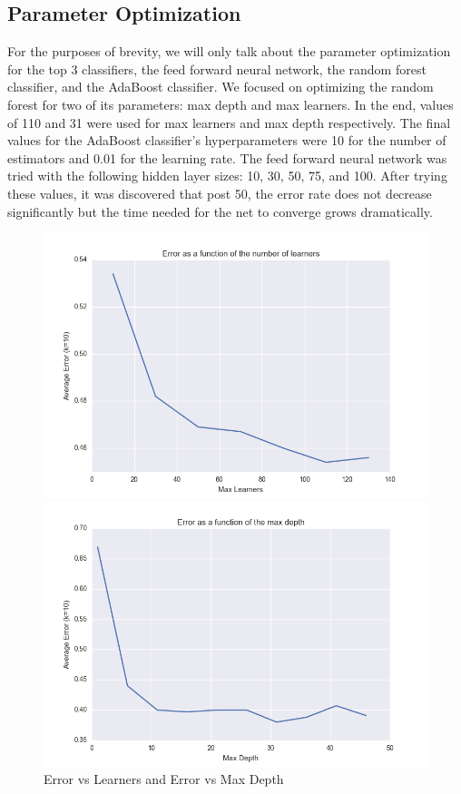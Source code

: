 \documentclass{article} %
\begin{document}
\subsection{Parameter Optimization}
For the purposes of brevity, we will only talk about the parameter optimization for the top 3 classifiers, the feed forward neural network, the random forest classifier, and the AdaBoost classifier. We focused on optimizing the random forest for two of its parameters: max depth and max learners. In the end, values of 110 and 31 were used for max learners and max depth respectively. The final values for the AdaBoost classifier's hyperparameters were 10 for the number of estimators and 0.01 for the learning rate. The feed forward neural network was tried with the following hidden layer sizes: 10, 30, 50, 75, and 100. After trying these values, it was discovered that post 50, the error rate does not decrease significantly but the time needed for the net to converge grows dramatically.
\begin{figure}[!ht]
\begin{center}
\caption{Error vs Learners and Error vs Max Depth}
\begin{minipage}[b]{0.40\linewidth}
	\includegraphics[scale=0.30]{ErrorVsLearners-RandomForest.png}
\end{minipage}
\begin{minipage}[b]{0.40\linewidth}
	\includegraphics[scale=0.30]{ErrorVsMaxDepth-RandomForest.png}
\end{minipage}
\end{center}
\end{figure}
\end{document}
